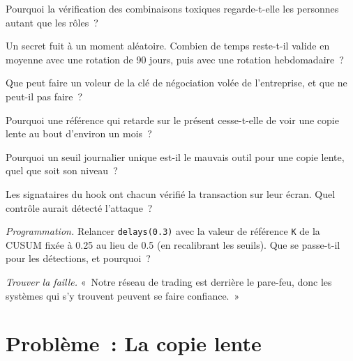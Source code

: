 \begin{exercise}[$\star$]\label{exo:pl:security:1}
Pourquoi la vérification des combinaisons toxiques regarde-t-elle les personnes autant que les rôles~?
\end{exercise}

\begin{exercise}[$\star$]\label{exo:pl:security:2}
Un secret fuit à un moment aléatoire. Combien de temps reste-t-il valide en moyenne avec une rotation de 90 jours, puis avec une rotation hebdomadaire~?
\end{exercise}

\begin{exercise}[$\star$]\label{exo:pl:security:3}
Que peut faire un voleur de la clé de négociation volée de l'entreprise, et que ne peut-il pas faire~?
\end{exercise}

\begin{exercise}[$\star\star$]\label{exo:pl:security:4}
Pourquoi une référence qui retarde sur le présent cesse-t-elle de voir une copie lente au bout d'environ un mois~?
\end{exercise}

\begin{exercise}[$\star\star$]\label{exo:pl:security:5}
Pourquoi un seuil journalier unique est-il le mauvais outil pour une copie lente, quel que soit son niveau~?
\end{exercise}

\begin{exercise}[$\star\star$]\label{exo:pl:security:6}
Les signataires du hook ont chacun vérifié la transaction sur leur écran. Quel contrôle aurait détecté l'attaque~?
\end{exercise}

\begin{exercise}[$\star\star\star$]\label{exo:pl:security:7}
\emph{Programmation.} Relancer \texttt{delays(0.3)} avec la valeur de référence \texttt{K} de la CUSUM fixée à 0.25 au lieu de 0.5 (en recalibrant les seuils).
Que se passe-t-il pour les détections, et pourquoi~?
\end{exercise}

\begin{exercise}[$\star\star\star$]\label{exo:pl:security:8}
\emph{Trouver la faille.} «~Notre réseau de trading est derrière le pare-feu, donc les systèmes qui s'y trouvent peuvent se faire confiance.~»
\end{exercise}

\section{Problème~: La copie lente}

